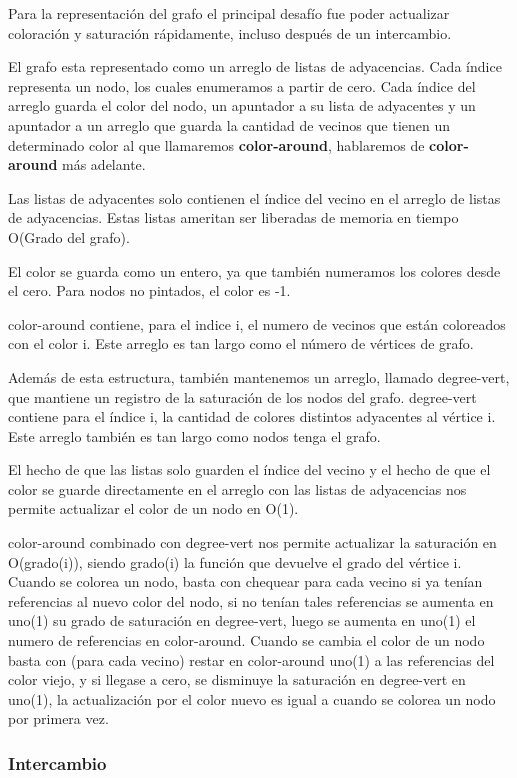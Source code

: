 \documentclass[a4paper,10pt]{article}
\begin{document}
Para la representación del grafo el principal desafío fue poder actualizar coloración y saturación rápidamente, incluso después de un intercambio.

El grafo esta representado como un arreglo de listas de adyacencias. Cada índice representa un nodo, los cuales enumeramos a partir de cero. Cada índice del arreglo guarda el color del nodo, un apuntador a su lista de adyacentes y un apuntador a un arreglo que guarda la cantidad de vecinos que tienen un determinado color al que llamaremos \textbf{color-around}, hablaremos de \textbf{color-around} más adelante.

Las listas de adyacentes solo contienen el índice del vecino en el arreglo de listas de adyacencias. Estas listas ameritan ser liberadas de memoria en tiempo O(Grado del grafo).

El color se guarda como un entero, ya que también numeramos los colores desde el cero. Para nodos no pintados, el color es -1.

color-around contiene, para el indice i, el numero de vecinos que están coloreados con el color i. Este arreglo es tan largo como el número de vértices de grafo.

Además de esta estructura, también mantenemos un arreglo, llamado degree-vert, que mantiene un registro de la saturación de los nodos del grafo. degree-vert contiene para el índice i, la cantidad de colores distintos adyacentes al vértice i. Este arreglo también es tan largo como nodos tenga el grafo.

El hecho de que las listas solo guarden el índice del vecino y el hecho de que el color se guarde directamente en el arreglo con las listas de adyacencias nos permite actualizar el color de un nodo en O(1).

color-around combinado con degree-vert nos permite actualizar la saturación en O(grado(i)), siendo grado(i) la función que devuelve el grado del vértice i. Cuando se colorea un nodo, basta con chequear para cada vecino si ya tenían referencias al nuevo color del nodo, si no tenían tales referencias se aumenta en uno(1) su grado de saturación en degree-vert, luego se aumenta en uno(1) el numero de referencias en color-around. Cuando se cambia el color de un nodo basta con (para cada vecino) restar en color-around uno(1) a las referencias del color viejo, y si llegase a cero, se disminuye la saturación en degree-vert en uno(1), la actualización por el color nuevo es igual a cuando se colorea un nodo por primera vez.

\subsubsection{Intercambio}
\end{document}
